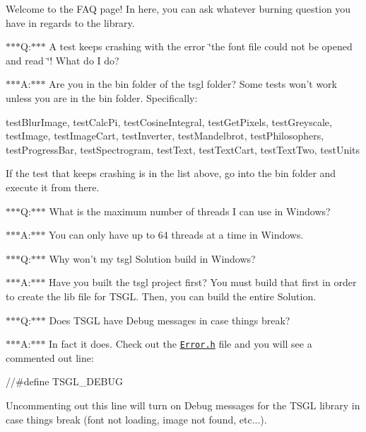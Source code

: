 Welcome to the F\-A\-Q page! In here, you can ask whatever burning question you have in regards to the library.

$\ast$$\ast$$\ast$\-Q\-:$\ast$$\ast$$\ast$ A test keeps crashing with the error \char`\"{}the font file could not be opened and read
\char`\"{}! What do I do?

$\ast$$\ast$$\ast$\-A\-:$\ast$$\ast$$\ast$ Are you in the bin folder of the tsgl folder? Some tests won't work unless you are in the bin folder. Specifically\-:

{\ttfamily test\-Blur\-Image}, {\ttfamily test\-Calc\-Pi}, {\ttfamily test\-Cosine\-Integral}, {\ttfamily test\-Get\-Pixels}, {\ttfamily test\-Greyscale}, {\ttfamily test\-Image}, {\ttfamily test\-Image\-Cart}, {\ttfamily test\-Inverter}, {\ttfamily test\-Mandelbrot}, {\ttfamily test\-Philosophers}, {\ttfamily test\-Progress\-Bar}, {\ttfamily test\-Spectrogram}, {\ttfamily test\-Text}, {\ttfamily test\-Text\-Cart}, {\ttfamily test\-Text\-Two}, {\ttfamily test\-Units}

If the test that keeps crashing is in the list above, go into the bin folder and execute it from there.

$\ast$$\ast$$\ast$\-Q\-:$\ast$$\ast$$\ast$ What is the maximum number of threads I can use in Windows?

$\ast$$\ast$$\ast$\-A\-:$\ast$$\ast$$\ast$ You can only have up to 64 threads at a time in Windows.

$\ast$$\ast$$\ast$\-Q\-:$\ast$$\ast$$\ast$ Why won't my tsgl Solution build in Windows?

$\ast$$\ast$$\ast$\-A\-:$\ast$$\ast$$\ast$ Have you built the tsgl project first? You must build that first in order to create the lib file for T\-S\-G\-L. Then, you can build the entire Solution.

$\ast$$\ast$$\ast$\-Q\-:$\ast$$\ast$$\ast$ Does T\-S\-G\-L have Debug messages in case things break?

$\ast$$\ast$$\ast$\-A\-:$\ast$$\ast$$\ast$ In fact it does. Check out the \href{http://calvin-cs.github.io/TSGL/html/_error_8h_source.html}{\tt Error.\-h} file and you will see a commented out line\-:


\begin{DoxyCode}
\textcolor{comment}{//#define TSGL\_DEBUG}
\end{DoxyCode}


Uncommenting out this line will turn on Debug messages for the T\-S\-G\-L library in case things break (font not loading, image not found, etc...).

